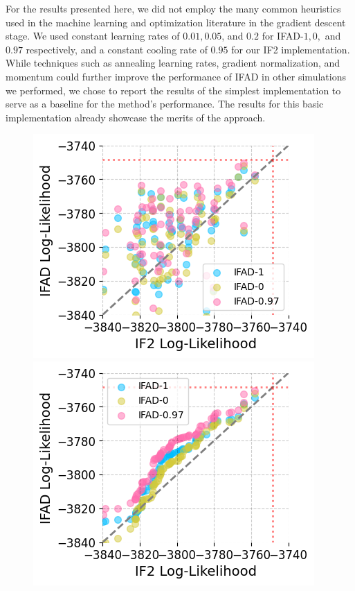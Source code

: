 \documentclass[numsec,webpdf,modern,medium,namedate]{oup-authoring-template}
\newcommand\arxiv[2]{#2} %
\theoremstyle{thmstyleone}%
\theoremstyle{thmstyletwo}%
\theoremstyle{thmstylethree}%
\begin{document}
For the results presented here, we did not employ the many common heuristics used in the machine learning and optimization literature in the gradient descent stage.
We used constant learning rates of $0.01, 0.05$, and $0.2$ for IFAD-$1,0,$ and $0.97$ respectively, and a constant cooling rate of $0.95$ for our IF2 implementation.
While techniques such as annealing learning rates, gradient normalization, and momentum could further improve the performance of IFAD in other simulations we performed, we chose to report the results of the simplest implementation to serve as a baseline for the method's performance.
The results for this basic implementation already showcase the merits of the approach.

\begin{figure}[htbp!]
    \centering
    \includegraphics[width=\arxiv{8cm}{\textwidth/\real{2.2}}]{imgs/095/pairs.png}
    \includegraphics[width=\arxiv{8cm}{\textwidth/\real{2.2}}]{imgs/095/qq.png}

\end{figure}
\end{document}
